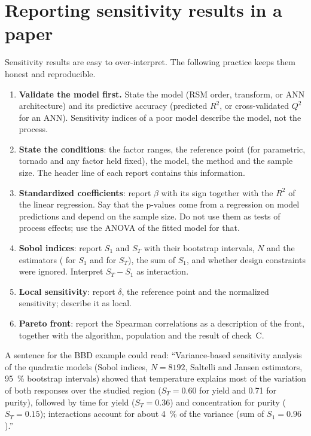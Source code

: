 \section{Reporting sensitivity results in a paper}
\label{sec:ch09-reporting}
Sensitivity results are easy to over-interpret. The following practice keeps them honest and reproducible.
\begin{enumerate}
  \item \textbf{Validate the model first.} State the model (RSM order, transform, or ANN architecture) and its
        predictive accuracy (predicted $R^2$, or cross-validated $Q^2$ for an ANN). Sensitivity indices of a poor model
        describe the model, not the process.
  \item \textbf{State the conditions}: the factor ranges, the reference point (for parametric, tornado and any factor
        held fixed), the model, the method and the sample size. The header line of each report contains this
        information.
  \item \textbf{Standardized coefficients}: report $\beta$ with its sign together with the $R^2$ of the linear
        regression. Say that the p-values come from a regression on model predictions and depend on the sample size.
        Do not use them as tests of process effects; use the ANOVA of the fitted model for that.
  \item \textbf{Sobol indices}: report $S_1$ and $S_T$ with their bootstrap intervals, $N$ and the estimators
        (\citealp{saltelli2010} for $S_1$ and \citealp{jansen1999} for $S_T$), the sum of $S_1$, and whether design
        constraints were ignored. Interpret $S_T-S_1$ as interaction.
  \item \textbf{Local sensitivity}: report $\delta$, the reference point and the normalized sensitivity; describe it as
        local.
  \item \textbf{Pareto front}: report the Spearman correlations as a description of the front, together with the
        algorithm, population and the result of check~C.
\end{enumerate}
A sentence for the BBD example could read: ``Variance-based sensitivity analysis of the quadratic models (Sobol indices,
$N=8192$, Saltelli and Jansen estimators, 95~\% bootstrap intervals) showed that temperature explains most of the
variation of both responses over the studied region ($S_T=0.60$ for yield and 0.71 for purity), followed by time for
yield ($S_T=0.36$) and concentration for purity ($S_T=0.15$); interactions account for about 4~\% of the variance
(sum of $S_1=0.96$).''
